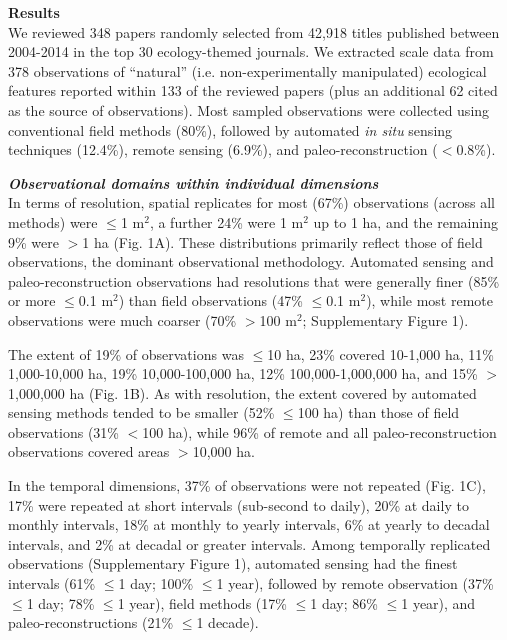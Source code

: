 \documentclass[12pt]{article}
\begin{document}
\vspace{10pt}
\noindent \textbf{Results}
\vspace{5pt}
\\
We reviewed 348 papers randomly selected from 42,918 titles published between 2004-2014 in the top 30 ecology-themed journals. We extracted scale data from 378 observations of ``natural'' (i.e. non-experimentally manipulated) ecological features reported within 133 of the reviewed papers (plus an additional 62 cited as the source of observations). Most sampled observations were collected using conventional field methods (80\%), followed by automated \emph{in situ} sensing techniques (12.4\%), remote sensing (6.9\%), and paleo-reconstruction ($<$0.8\%). 

\vspace{5pt}
\noindent \textbf{\emph{Observational domains within individual dimensions}}\\
In terms of resolution, spatial replicates for most (67\%) observations (across all methods) were $\leq$1 m$^2$, a further 24\% were 1 m$^2$ up to 1 ha, and the remaining 9\% were $>$1 ha (Fig. 1A). These distributions primarily reflect those of field observations, the dominant observational methodology. Automated sensing and paleo-reconstruction observations had resolutions that were generally finer (85\% or more $\leq$0.1 m$^2$) than field observations (47\% $\leq$0.1 m$^2$), while most remote observations were much coarser (70\% $>$100 m$^2$; Supplementary Figure 1).   

The extent of 19\% of observations was $\leq$10 ha, 23\% covered 10-1,000 ha, 11\% 1,000-10,000 ha, 19\% 10,000-100,000 ha, 12\% 100,000-1,000,000 ha, and 15\% $>$1,000,000 ha (Fig. 1B).  As with resolution, the extent covered by automated sensing methods tended to be smaller (52\% $\leq$100 ha) than those of field observations (31\% $<$100 ha), while 96\% of remote and all paleo-reconstruction observations covered areas $>$10,000 ha.  

In the temporal dimensions, 37\% of observations were not repeated (Fig. 1C), 17\% were repeated at short intervals (sub-second to daily), 20\% at daily to monthly intervals, 18\% at monthly to yearly intervals, 6\% at yearly to decadal intervals, and 2\% at decadal or greater intervals. Among temporally replicated observations (Supplementary Figure 1), automated sensing had the finest intervals (61\% $\leq$1 day; 100\% $\leq$1 year), followed by remote observation (37\% $\leq$1 day; 78\% $\leq$1 year), field methods (17\% $\leq$1 day; 86\% $\leq$1 year), and paleo-reconstructions (21\% $\leq$1 decade).   
\end{document}
